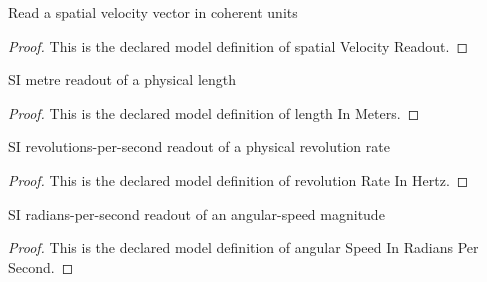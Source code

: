 \begin{definition}
  \label{def:physics:phyx-mini-0818:phyxminiproblems-problemphyxmini0818-spatialvelocityreadout}
  Read a spatial velocity vector in coherent units
\end{definition}
\begin{proof}
  This is the declared model definition of spatial Velocity Readout.
\end{proof}
\begin{definition}
  \label{def:physics:phyx-mini-0818:phyxminiproblems-problemphyxmini0818-lengthinmeters}
  SI metre readout of a physical length
\end{definition}
\begin{proof}
  This is the declared model definition of length In Meters.
\end{proof}
\begin{definition}
  \label{def:physics:phyx-mini-0818:phyxminiproblems-problemphyxmini0818-revolutionrateinhertz}
  SI revolutions-per-second readout of a physical revolution rate
\end{definition}
\begin{proof}
  This is the declared model definition of revolution Rate In Hertz.
\end{proof}
\begin{definition}
  \label{def:physics:phyx-mini-0818:phyxminiproblems-problemphyxmini0818-angularspeedinradianspersecond}
  SI radians-per-second readout of an angular-speed magnitude
\end{definition}
\begin{proof}
  This is the declared model definition of angular Speed In Radians Per Second.
\end{proof}
